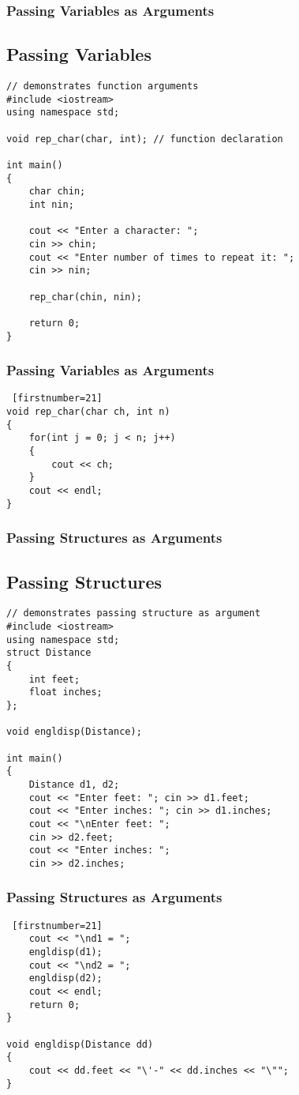 \documentclass{beamer}
\begin{document}
\begin{frame} [fragile]
    \frametitle{Passing Variables as Arguments}
    \subsection{Passing Variables} %
    \label{sub:passing_variables}
    \lstset{style=mystyle}
\begin{lstlisting}
// demonstrates function arguments
#include <iostream>
using namespace std;

void rep_char(char, int); // function declaration

int main()
{
    char chin;
    int nin;

    cout << "Enter a character: ";
    cin >> chin;
    cout << "Enter number of times to repeat it: ";
    cin >> nin;

    rep_char(chin, nin);

    return 0;
}
\end{lstlisting}
\end{frame}

\begin{frame} [fragile]
    \frametitle{Passing Variables as Arguments}
    \lstset{style=mystyle}
\begin{lstlisting} [firstnumber=21]
void rep_char(char ch, int n)
{
    for(int j = 0; j < n; j++)
    {
        cout << ch;
    }
    cout << endl;
}
\end{lstlisting}
\end{frame}

\begin{frame} [fragile]
    \frametitle{Passing Structures as Arguments}
    \subsection{Passing Structures} %
    \label{sub:passing_structures}
    \lstset{style=mystyle}
\begin{lstlisting}
// demonstrates passing structure as argument
#include <iostream>
using namespace std;
struct Distance
{
    int feet;
    float inches;
};

void engldisp(Distance);

int main()
{
    Distance d1, d2;
    cout << "Enter feet: "; cin >> d1.feet;
    cout << "Enter inches: "; cin >> d1.inches;
    cout << "\nEnter feet: ";
    cin >> d2.feet;
    cout << "Enter inches: ";
    cin >> d2.inches;
\end{lstlisting}
\end{frame}

\begin{frame} [fragile]
    \frametitle{Passing Structures as Arguments}
    \lstset{style=mystyle}
\begin{lstlisting} [firstnumber=21]
    cout << "\nd1 = ";
    engldisp(d1);
    cout << "\nd2 = ";
    engldisp(d2);
    cout << endl;
    return 0;
}

void engldisp(Distance dd)
{
    cout << dd.feet << "\'-" << dd.inches << "\"";
}
\end{lstlisting}
\end{frame}
\end{document}
